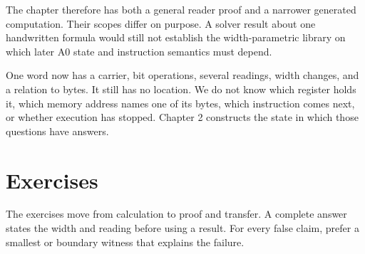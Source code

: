 The chapter therefore has both a general reader proof and a narrower generated
computation. Their scopes differ on purpose. A solver result about one
handwritten formula would still not establish the width-parametric library on
which later A0 state and instruction semantics must depend.

One word now has a carrier, bit operations, several readings, width changes,
and a relation to bytes. It still has no location. We do not know which
register holds it, which memory address names one of its bytes, which
instruction comes next, or whether execution has stopped. Chapter 2 constructs
the state in which those questions have answers.

\section{Exercises}

The exercises move from calculation to proof and transfer. A complete answer
states the width and reading before using a result. For every false claim,
prefer a smallest or boundary witness that explains the failure.

